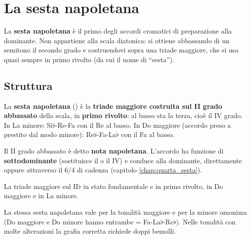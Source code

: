 \chapter{La sesta napoletana}
\label{chap:sesta_napoletana}

La \textbf{sesta napoletana} è il primo degli accordi cromatici di preparazione alla dominante. Non appartiene alla scala diatonica: si ottiene abbassando di un semitono il secondo grado e costruendovi sopra una triade maggiore, che si usa quasi sempre in primo rivolto (da cui il nome di ``sesta'').

\section{Struttura}
\label{sec:struttura_napoletana}

\begin{definizione}
	\label{def:sesta_napoletana}
	La \textbf{sesta napoletana} () è la \textbf{triade maggiore costruita sul II grado abbassato} della scala, in \textbf{primo rivolto}: al basso sta la terza, cioè il IV grado. In La minore: Si$\flat$-Re-Fa con il Re al basso. In Do maggiore (accordo preso a prestito dal modo minore): Re$\flat$-Fa-La$\flat$ con il Fa al basso.
\end{definizione}

Il II grado abbassato è detto \textbf{nota napoletana}. L'accordo ha funzione di \textbf{sottodominante} (sostituisce il  o il IV) e conduce alla dominante, direttamente oppure attraverso il 6/4 di cadenza (capitolo \ref{chap:quarta_sesta}).

\begin{esempio}
	\label{ex:costruzione_napoletana}
	La triade maggiore sul II$\flat$ in stato fondamentale e in primo rivolto, in Do maggiore e in La minore.
\end{esempio}

La stessa sesta napoletana vale per la tonalità maggiore e per la minore omonima (Do maggiore e Do minore hanno entrambe  = Fa-La$\flat$-Re$\flat$). Nelle tonalità con molte alterazioni la grafia corretta richiede doppi bemolli.

